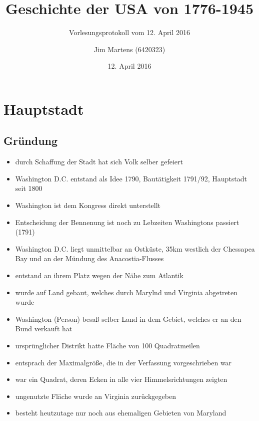 \documentclass[10pt,a4paper,oneside,ngerman,numbers=noenddot]{scrartcl}
\newenvironment{myitemize}{\begin{itemize}\itemsep -9pt}{\end{itemize}} %
\begin{document}
\author{Jim Martens (6420323)}
\title{Geschichte der USA von 1776-1945}
\subtitle{Vorlesungsprotokoll vom 12. April 2016}
\date{12. April 2016}
\maketitle

\section*{Hauptstadt}

\subsection*{Gründung}
\begin{myitemize}
    \item durch Schaffung der Stadt hat sich Volk selber gefeiert
    \item Washington D.C. entstand als Idee 1790, Bautätigkeit 1791/92,
          Hauptstadt seit 1800
    \item Washington ist dem Kongress direkt unterstellt
    \item Entscheidung der Bennenung ist noch zu Lebzeiten Washingtons passiert (1791)
    \item Washington D.C. liegt unmittelbar an Ostküste, 35km westlich
          der Chessapea Bay und an der Mündung des Anacostia-Flusses
    \item entstand an ihrem Platz wegen der Nähe zum Atlantik
    \item wurde auf Land gebaut, welches durch Marylnd und Virginia abgetreten wurde
    \item Washington (Person) besaß selber Land in dem Gebiet, welches er an den Bund verkauft hat
    \item ursprünglicher Distrikt hatte Fläche von 100 Quadratmeilen
    \item entsprach der Maximalgröße, die in der Verfassung vorgeschrieben war
    \item war ein Quadrat, deren Ecken in alle vier Himmelsrichtungen zeigten
    \item ungenutzte Fläche wurde an Virginia zurückgegeben
    \item besteht heutzutage nur noch aus ehemaligen Gebieten von Maryland
\end{myitemize}
\end{document}
